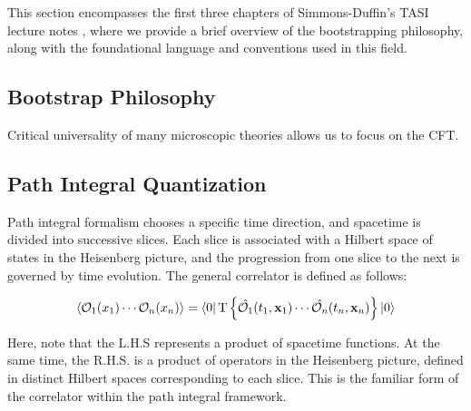 \documentclass[12pt]{article}
\numberwithin{equation}{section}
\newcommand\<\langle
\renewcommand\>\rangle
\renewcommand\.{\cdot}
\begin{document}
This section encompasses the first three chapters of Simmons-Duffin's TASI lecture notes \cite{simmonsduffin2016tasilecturesconformalbootstrap}, where we provide a brief overview of the bootstrapping philosophy, along with the foundational language and conventions used in this field.

\subsection{Bootstrap Philosophy}
Critical universality of many microscopic theories allows us to focus on the CFT.

\subsection{Path Integral Quantization}
Path integral formalism chooses a specific time direction, and spacetime is divided into successive slices. Each slice is associated with a Hilbert space of states in the Heisenberg picture, and the progression from one slice to the next is governed by time evolution. The general correlator is defined as follows:

\begin{equation}
    \langle\mathcal{O}_1(x_1)\cdots\mathcal{O}_n(x_n)\rangle = \bra{0}\text{T}\left\{\hat{\mathcal{O}_1}(t_1,\mathbf{x}_1)\cdots\hat{\mathcal{O}_n}(t_n,\mathbf{x}_n)\right\}\ket{0}
\end{equation}

Here, note that the L.H.S represents a product of spacetime functions. At the same time, the R.H.S. is a product of operators in the Heisenberg picture, defined in distinct Hilbert spaces corresponding to each slice. This is the familiar form of the correlator within the path integral framework.
\end{document}
